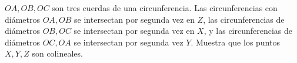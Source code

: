 $OA, OB, OC$ son tres cuerdas de una circunferencia. Las circunferencias con diámetros $OA, OB$ se intersectan por segunda vez en $Z$, las circunferencias de diámetros $OB, OC$ se intersectan por segunda vez en $X$, y las circunferencias de diámetros $OC, OA$ se intersectan por segunda vez $Y$. Muestra que los puntos $X, Y, Z$ son colineales. 